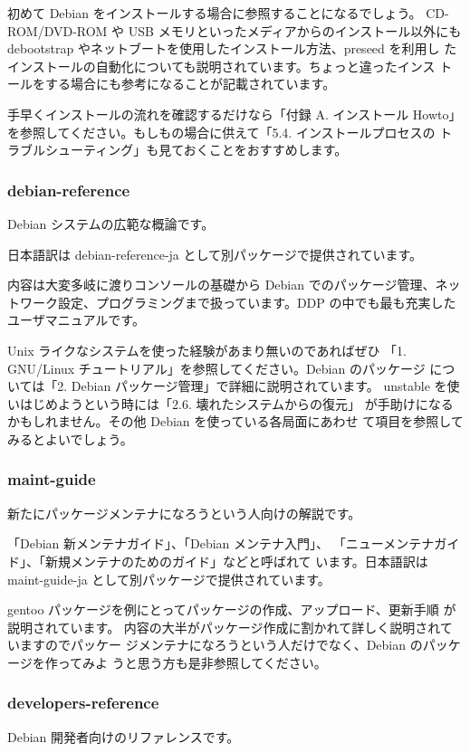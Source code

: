 \documentclass[mingoth,a4paper]{jsarticle}
\begin{document}
初めて Debian をインストールする場合に参照することになるでしょう。
CD-ROM/DVD-ROM や USB メモリといったメディアからのインストール以外にも
debootstrap やネットブートを使用したインストール方法、preseed を利用し
たインストールの自動化についても説明されています。ちょっと違ったインス
トールをする場合にも参考になることが記載されています。

手早くインストールの流れを確認するだけなら「付録 A. インストール Howto」
を参照してください。もしもの場合に供えて「5.4. インストールプロセスの
  トラブルシューティング」も見ておくことをおすすめします。


\subsubsection{debian-reference}
Debian システムの広範な概論です。

日本語訳は debian-reference-ja として別パッケージで提供されています。

内容は大変多岐に渡りコンソールの基礎から Debian でのパッケージ管理、ネッ
トワーク設定、プログラミングまで扱っています。DDP の中でも最も充実した
ユーザマニュアルです。

Unix ライクなシステムを使った経験があまり無いのであればぜひ
「1. GNU/Linux チュートリアル」を参照してください。Debian のパッケージ
については「2. Debian パッケージ管理」で詳細に説明されています。
unstable を使いはじめようという時には「2.6. 壊れたシステムからの復元」
が手助けになるかもしれません。その他 Debian を使っている各局面にあわせ
て項目を参照してみるとよいでしょう。


\subsubsection{maint-guide}
新たにパッケージメンテナになろうという人向けの解説です。

「Debian 新メンテナガイド」、「Debian メンテナ入門」、
「ニューメンテナガイド」、「新規メンテナのためのガイド」などと呼ばれて
います。日本語訳は maint-guide-ja として別パッケージで提供されています。

gentoo パッケージを例にとってパッケージの作成、アップロード、更新手順
が説明されています。
内容の大半がパッケージ作成に割かれて詳しく説明されていますのでパッケー
ジメンテナになろうという人だけでなく、Debian のパッケージを作ってみよ
うと思う方も是非参照してください。


\subsubsection{developers-reference}
Debian 開発者向けのリファレンスです。
\end{document}
